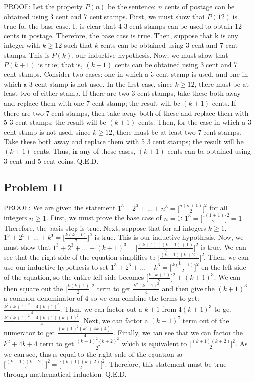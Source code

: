 \documentclass{article}
\begin{document}
PROOF: Let the property $P(n)$ be the sentence: $n$ cents of postage can be obtained using 3 cent and 7 cent stamps. First, we must show that $P(12)$ is true for the base case. It is clear that $4$ 3 cent stamps can be used to obtain 12 cents in postage. Therefore, the base case is true. Then, suppose that k is any integer with $k \geq 12$ such that $k$ cents can be obtained using 3 cent and 7 cent stamps. This is $P(k)$, our inductive hypothesis. Now, we must show that $P(k+1)$ is true; that is, $(k+1)$ cents can be obtained using 3 cent and 7 cent stamps. Consider two cases: one in which a 3 cent stamp is used, and one in which a 3 cent stamp is not used. In the first case, since $k \geq 12$, there must be at least two of either stamp. If there are two 3 cent stamps, take these both away and replace them with one 7 cent stamp; the result will be $(k+1)$ cents. If there are two 7 cent stamps, then take away both of these and replace them with 5 3 cent stamps; the result will be $(k+1)$ cents. Then, for the case in which a 3 cent stamp is not used, since $k \geq 12$, there must be at least two 7 cent stamps. Take these both away and replace them with 5 3 cent stamps; the result will be $(k+1)$ cents. Thus, in any of these cases, $(k+1)$ cents can be obtained using 3 cent and 5 cent coins. Q.E.D.

\subsection*{Problem 11}

PROOF: We are given the statement $1^3 + 2^3 + ... + n^3 = \lbrack \frac{n(n+1)}{2} \rbrack ^2$ for all integers $n \geq 1$. First, we must prove the base case of $n=1$: $1^3 =\lbrack \frac{1(1+1)}{2} \rbrack ^2 = 1$. Therefore, the basis step is true. Next, suppose that for all integers $k \geq 1$, $1^3 + 2^3 + ... + k^3 = \lbrack \frac{k(k+1)}{2} \rbrack ^2$ is true. This is our inductive hypothesis. Now, we must show that $1^3 + 2^3 + ... + (k+1)^3 = \lbrack \frac{(k+1)((k+1)+1)}{2} \rbrack ^2$ is true. We can see that the right side of the equation simplifies to $\lbrack \frac{(k+1)(k+2)}{2} \rbrack ^2$. Then, we can use our inductive hypothesis to set  $1^3 + 2^3 + ... + k^3 = \lbrack \frac{k(k+1)}{2} \rbrack ^2$ on the left side of the equation, so the entire left side becomes $\lbrack \frac{k(k+1)}{2} \rbrack ^2 + (k+1)^3$. We can then square out the $\lbrack \frac{k(k+1)}{2} \rbrack ^2$ term to get $\frac{k^{2}(k+1)^{2}}{4}$ and then give the $(k+1)^3$ a common denominator of 4 so we can combine the terms to get: $\frac{k^{2}(k+1)^{2} + 4(k+1)^3}{4}$. Then, we can factor out a $k+1$ from $4(k+1)^3$ to get $\frac{k^{2}(k+1)^{2} + 4(k+1)(k+1)^2}{4}$. Next, we can factor a $(k+1)^2$ term out of the numerator to get $\frac{(k+1)^{2}(k^2+ 4k+4))}{4}$. Finally, we can see that we can factor the $k^2+4k+4$ term to get $\frac{(k+1)^{2}(k+2)^{2}}{2^2}$ which is equivalent to $\lbrack \frac{(k+1)(k+2)}{2} \rbrack ^2$. As we can see, this is equal to the right side of the equation so $\lbrack \frac{(k+1)(k+2)}{2} \rbrack ^2 = \lbrack \frac{(k+1)(k+2)}{2} \rbrack ^2$. Therefore, this statement must be true through mathematical induction. Q.E.D.
\end{document}
